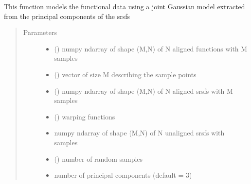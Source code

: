 \documentclass[letterpaper,10pt,english]{sphinxmanual}
\begin{document}

\begin{fulllineitems}
\label{\detokenize{gauss_model:gauss_model.joint_gauss_model}}
This function models the functional data using a joint Gaussian model
extracted from the principal components of the srsfs
\begin{quote}\begin{description}
\item[{Parameters}] \leavevmode\begin{itemize}
\item {} 
 () \textendash{} numpy ndarray of shape (M,N) of N aligned functions with
M samples

\item {} 
 () \textendash{} vector of size M describing the sample points

\item {} 
 () \textendash{} numpy ndarray of shape (M,N) of N aligned srsfs with M samples

\item {} 
 () \textendash{} warping functions

\item {} 
 \textendash{} numpy ndarray of shape (M,N) of N unaligned srsfs with  samples

\item {} 
 () \textendash{} number of random samples

\item {} 
 \textendash{} number of principal components (default = 3)

\end{itemize}


\end{description}
\end{quote}
\end{fulllineitems}
\end{document}
